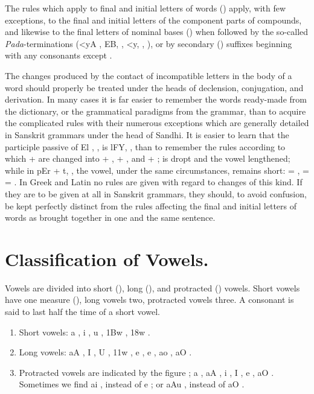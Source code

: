 The rules which apply to final and initial letters of words ()
apply, with few exceptions, to the final and initial letters of the
component parts of compounds, and likewise to the final letters of
nominal bases () when followed by the so-called
\emph{Pada}-terminations ({\dn <yA\2} , {\dn EB,} ,
{\dn <y,} , {\dn {}} ), or by secondary ()
suffixes beginning with any consonants except .

The changes produced by the contact of incompatible letters in the body
of a word should properly be treated under the heads of declension,
conjugation, and derivation. In many cases it is far easier to remember
the words ready-made from the dictionary, or the grammatical paradigms
from the grammar, than to acquire the complicated rules with their
numerous exceptions which are generally detailed in Sanskrit grammars
under the head of Sandhi. It is easier to learn that the participle
passive of {\dn El} , , is {\dn lFY,} ,
than to remember the rules according to which {\dn {}} + {\dn {}}  are
changed into {\dn {}} + {\dn {}} , {\dn {}} + {\dn {}} , and
{\dn {}} + {\dn {}} ; {\dn {}}  is dropt and the vowel
lengthened; while in {\dn pEr} + {\dn t,} , the vowel,
under the same circumstances, remains short:  =
,  =  =
. In Greek and Latin no rules are given with regard to
changes of this kind. If they are to be given at all in Sanskrit
grammars, they should, to avoid confusion, be kept perfectly distinct
from the rules affecting the final and initial letters of words as
brought together in one and the same sentence.

\section{Classification of Vowels.}

\s Vowels are divided into short (), long (), and
protracted () vowels. Short vowels have one measure
(), long vowels two, protracted vowels three. A consonant is
said to last half the time of a short vowel.

\begin{enumerate}
\item Short vowels: {\dn a} , {\dn i} , {\dn u} , {\dn \31Bw} ,
  {\dn \318w} .
\item Long vowels: {\dn aA} , {\dn I} , {\dn U} , {\dn \311w}
  , {\dn e} , {\dn e\?} , {\dn ao} , {\dn aO} .
\item Protracted vowels are indicated by the figure {\dn {}} ; {\dn a}
  , {\dn aA} , {\dn i} , {\dn I} , {\dn e} ,
  {\dn aO} . Sometimes we find {\dn ai} , instead of {\dn e}
  ; or {\dn aAu} , instead of {\dn aO} .
\end{enumerate}

